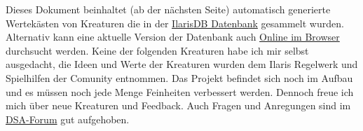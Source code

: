 \documentclass{Ilaris}
\begin{document}
\anfang
{}
\platz
{}
\lizenz
\hauptteil
\inhaltsverzeichnis


\par{}\relax{}\relax
\vspace{2cm}
\Large
Dieses Dokument beinhaltet (ab der nächsten Seite) automatisch generierte Wertekästen von Kreaturen die in der \href{https://github.com/Ilaris-Tools/IlarisDB}{IlarisDB Datenbank} gesammelt wurden. Alternativ kann eine aktuelle Version der Datenbank auch \href{https://ilaris-tools.github.io/IlarisDB/db/kreaturen/}{Online im Browser} durchsucht werden. Keine der folgenden Kreaturen habe ich mir selbst ausgedacht, die Ideen und Werte der Kreaturen wurden dem Ilaris Regelwerk und Spielhilfen der Comunity entnommen. Das Projekt befindet sich noch im Aufbau und es müssen noch jede Menge Feinheiten verbessert werden. Dennoch freue ich mich über neue Kreaturen und Feedback. Auch Fragen und Anregungen sind im \href{https://dsaforum.de/viewtopic.php?f=180&t=58027}{DSA-Forum} gut aufgehoben.
\par{}\relax{}\relax
\end{document}
